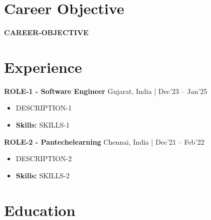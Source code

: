 \documentclass[a4paper,11pt]{article}
\begin{document}
\vspace{-7mm}

\section{\textbf{Career Objective}}
\vspace{1mm}

\textbf{CAREER-OBJECTIVE}
\section{\textbf{Experience}}


\vspace{1mm}
  \textbf{ROLE-1 - Software Engineer} \hfill Gujarat, India | Dec'23 -- Jan'25
\vspace{-1.5mm} %
\begin{itemize}
  \item DESCRIPTION-1


\vspace{-2mm}
  \item \textbf{Skills:} SKILLS-1
\end{itemize}

\vspace{1mm}
  \textbf{ ROLE-2 - Pantechelearning} \hfill Chennai, India | Dec'21 -- Feb'22
\vspace{-1.5mm} %
\begin{itemize}
  \item DESCRIPTION-2
\vspace{-2mm}
  \item \textbf{Skills:} SKILLS-2
\end{itemize}\section{\textbf{Education}}
\vspace{-0.4mm}
\end{document}
